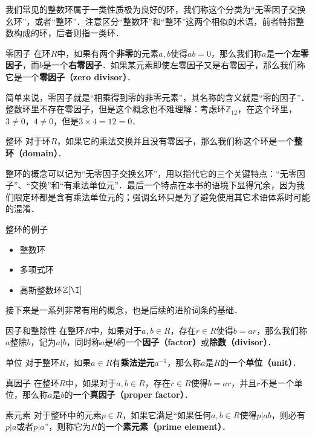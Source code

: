 


我们常见的整数环属于一类性质极为良好的环，我们称这个分类为“无零因子交换幺环”，或者“整环”．注意区分“整数环”和“整环”这两个相似的术语，前者特指整数构成的环，后者则指一类环．

\begin{definition}{零因子}
在环$R$中，如果有两个\textbf{非零}的元素$a, b$使得$ab=0$，那么我们称$a$是一个\textbf{左零因子}，而$b$是一个\textbf{右零因子}．如果某元素即使左零因子又是右零因子，那么我们称它是一个\textbf{零因子（zero divisor）}．
\end{definition}

简单来说，零因子就是“相乘得到零的非零元素”，其名称的含义就是“零的因子”．整数环里不存在零因子，但是这个概念也不难理解：考虑环$\mathbb{Z}_{12}$，在这个环里，$3\not=0$，$4\not=0$，但是$3\times 4=12=0$．

\begin{definition}{整环}
对于环$R$，如果它的乘法交换并且没有零因子，那么我们称这个环是一个\textbf{整环（domain）}．
\end{definition}

整环的概念可以记为“无零因子交换幺环”，用以指代它的三个关键特点：“无零因子”、“交换”和“有乘法单位元”．最后一个特点在本书的语境下显得冗余，因为我们限定环都是含有乘法单位元的；强调幺环只是为了避免使用其它术语体系时可能的混淆．

\begin{example}{整环的例子}
\begin{itemize}
\item 整数环
\item 多项式环
\item 高斯整数环$\mathbb{Z}[\I]$
\end{itemize}

\end{example}

接下来是一系列非常有用的概念，也是后续的进阶词条的基础．

\begin{definition}{因子和整除性}
在整环$R$中，如果对于$a, b\in R$，存在$r\in R$使得$b=ar$，那么我们称$a$整除$b$，记为$a|b$，同时称$a$是$b$的一个\textbf{因子（factor）}或\textbf{除数（divisor）}．
\end{definition}

\begin{definition}{单位}
对于整环$R$，如果$a\in R$有\textbf{乘法逆元}$a^{-1}$，那么称$a$是$R$的一个\textbf{单位（unit）}．
\end{definition}

\begin{definition}{真因子}
在整环$R$中，如果对于$a, b\in R$，存在$r\in R$使得$b=ar$，并且$r$不是一个单位，那么称$a$是$b$的一个\textbf{真因子（proper factor）}．
\end{definition}

\begin{definition}{素元素}
对于整环中的元素$p\in R$，如果它满足“如果任何$a, b\in R$使得$p|ab$，则必有$p|a$或者$p|a$”，则称它为$R$的一个\textbf{素元素（prime element）}．
\end{definition}





